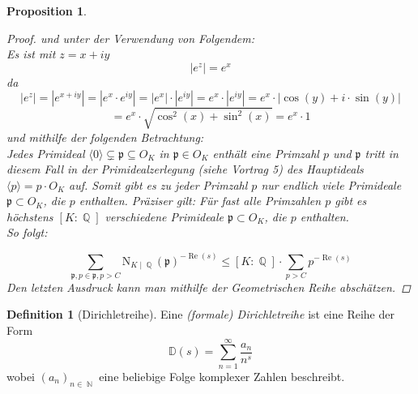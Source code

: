 \documentclass[10pt,a4paper]{article}
\theoremstyle{plain}
\newtheorem{prop}[thm]{Proposition}
\theoremstyle{definition}
\newtheorem{defn}{Definition}[section]
\theoremstyle{remark}
\DeclareMathOperator{\Q}{\mathbb{Q}}
\DeclareMathOperator{\N}{\mathbb{N}}
\DeclareMathOperator{\re}{Re}
\begin{document}
\begin{prop}
\begin{proof}
 und unter der Verwendung von Folgendem: \\Es ist mit $z = x + iy$ $$|e^z| = e^x $$ da $$|e^z|=|e^{x+iy}|=|e^{x}\cdot e^{iy}|= |e^{x}|\cdot |e^{iy}| = e^{x}\cdot |e^{iy}| = e^x \cdot |\cos(y)+i \cdot \sin(y)| $$ $$= e^x\cdot\sqrt{\cos^2(x)+\sin^2(x)} =e^x\cdot 1$$
und mithilfe der folgenden Betrachtung: \\Jedes Primideal $\langle0\rangle\subsetneq \mathfrak{p} \subseteq O_{\textit{K}}$ in $\mathfrak{p} \in O_K$ enthält eine Primzahl $p$ und $\mathfrak{p}$ tritt in diesem Fall in der Primidealzerlegung (siehe Vortrag 5) des Hauptideals $\langle p \rangle=p\cdot O_K$ auf. Somit gibt es zu jeder Primzahl $p$ nur endlich viele Primideale $\mathfrak{p}\subset O_K$, die $p$ enthalten. Präziser gilt: Für fast alle Primzahlen $p$ gibt es höchstens $[K\colon \Q]$ verschiedene Primideale $\mathfrak{p}\subset O_K$, die $p$ enthalten. 
\\
So folgt:

$$\sum_{\mathfrak{p},p\in \mathfrak{p},p>C}\mathrm{N}_{K\mid \Q}(\mathfrak{p})^{-\re(s)} \leq [K\colon\Q]\cdot \sum_{p>C}p^{-\re(s)} $$Den letzten Ausdruck kann man mithilfe der Geometrischen Reihe abschätzen.
\end{proof}
\end{prop}


\begin{defn}[Dirichletreihe]

Eine \textit{(formale) Dirichletreihe} ist eine Reihe der Form $$\mathbb{D}(s) = \sum_{n =1}^{\infty}\frac{a_n}{n^s} $$ wobei $(a_n)_{n \in \N}$ eine beliebige Folge komplexer Zahlen beschreibt.

\end{defn}
\end{document}
